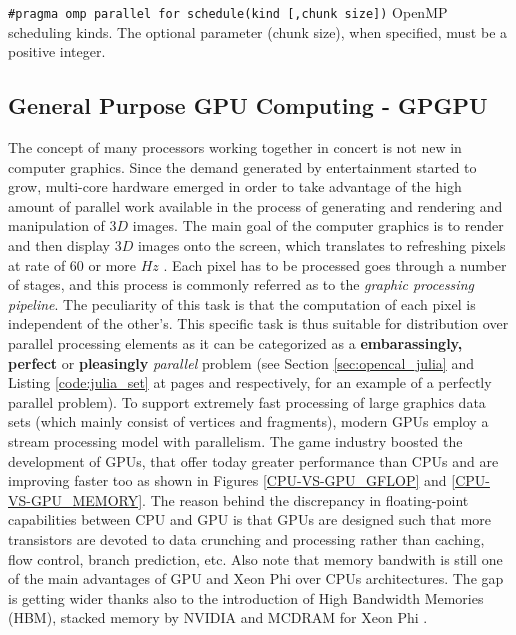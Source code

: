 \begin{description}
\begin{table}
    	\caption[OpenMP scheduling policies]{\texttt{\#pragma omp parallel for schedule(kind [,chunk size])} OpenMP scheduling kinds. The optional parameter (chunk size), when specified, must be a positive integer. }
    	\label{tab:scheduling_policies}
    \end{table}
    
    \subsection{General Purpose GPU Computing - GPGPU}
    The concept of many processors working together in concert is not new in computer graphics. Since the demand generated by entertainment started to grow, multi-core hardware emerged in order to take advantage of the high amount of parallel work available in the process of generating and rendering and manipulation of $3D$ images.
    The main goal of the computer graphics is to render and then display $3D$ images onto the screen, which translates to refreshing pixels at rate of 60 or more $\si{Hz}$ \cite{Akenine-Moller:2002:RR:553838}.
    Each pixel has to be processed goes through a number of stages, and this process is commonly referred as to the \emph{graphic processing pipeline}.
    The peculiarity of this task is that the computation of each pixel is independent of the other's.
    This specific task is thus suitable for distribution over parallel processing elements as it can be categorized as  a \textbf{embarassingly, perfect} or \textbf{pleasingly} \textit{parallel} problem\cite{Foster:1995:DBP:527029} (see Section \ref{sec:opencal_julia} and Listing \ref{code:julia_set} at pages \pageref{sec:opencal_julia} and \pageref{code:julia_set} respectively, for an example of a perfectly parallel problem).
    To support extremely fast processing of large graphics data sets (which mainly consist of vertices and fragments), modern GPUs employ a stream processing model with parallelism.
    The game industry boosted the development of  GPUs, that offer today greater performance than CPUs and are improving faster too as shown in Figures  \ref{CPU-VS-GPU_GFLOP} and \ref{CPU-VS-GPU_MEMORY}.
    The reason behind the discrepancy in floating-point capabilities between CPU and  GPU is that GPUs are designed such that more transistors are devoted to data crunching and processing rather than caching, flow control, branch prediction, etc.
    Also note that memory bandwith is still one of the main advantages of GPU and Xeon Phi over CPUs architectures. The gap is getting wider thanks also to the introduction of High Bandwidth Memories (HBM), stacked memory by NVIDIA and MCDRAM for Xeon Phi \cite{Sodani:7477467,Jun:7939084}. 

\end{description}
